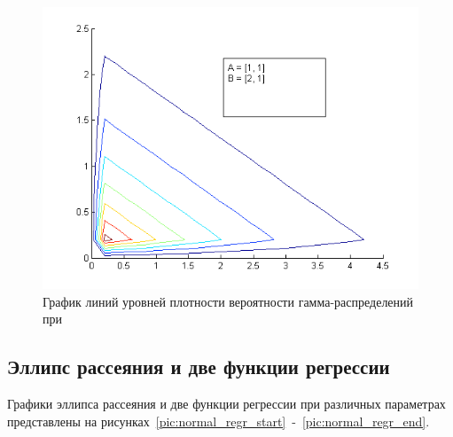 \begin{figure}[h]
  \centering
  \includegraphics[width=0.58\linewidth]{../pic/gamma_contour_3}
  \caption{График линий уровней плотности вероятности гамма-распределений при}
  \label{pic:gamma_contour_end}
\end{figure}

\newpage

\subsection{Эллипс рассеяния и две функции регрессии}

Графики эллипса рассеяния и две функции регрессии при различных параметрах
представлены на рисунках~\ref{pic:normal_regr_start}~-~\ref{pic:normal_regr_end}.


